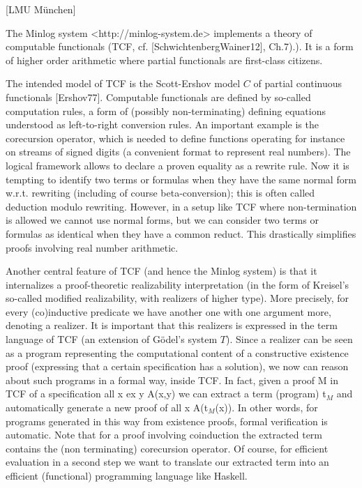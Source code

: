 [LMU München]

The Minlog system <http://minlog-system.de> implements a theory of
computable functionals (TCF, cf. [SchwichtenbergWainer12], Ch.7).).
It is a form of higher order arithmetic where partial functionals are
first-class citizens.

The intended model of TCF is the Scott-Ershov model $C$ of partial
continuous functionals [Ershov77].  Computable functionals are defined
by so-called computation rules, a form of (possibly non-terminating)
defining equations understood as left-to-right conversion rules.  An
important example is the corecursion operator, which is needed to
define functions operating for instance on streams of signed digits (a
convenient format to represent real numbers).  The logical framework
allows to declare a proven equality as a rewrite rule.  Now it is
tempting to identify two terms or formulas when they have the same
normal form w.r.t. rewriting (including of course beta-conversion);
this is often called deduction modulo rewriting.  However, in a setup
like TCF where non-termination is allowed we cannot use normal forms,
but we can consider two terms or formulas as identical when they have
a common reduct.  This drastically simplifies proofs involving real
number arithmetic.

Another central feature of TCF (and hence the Minlog system) is that
it internalizes a proof-theoretic realizability interpretation (in the
form of Kreisel's so-called modified realizability, with realizers of
higher type).  More precisely, for every (co)inductive predicate we
have another one with one argument more, denoting a realizer.  It is
important that this realizers is expressed in the term language of TCF
(an extension of G\"odel's system $T$).  Since a realizer can be seen as
a program representing the computational content of a constructive
existence proof (expressing that a certain specification has a
solution), we now can reason about such programs in a formal way,
inside TCF.  In fact, given a proof M in TCF of a specification all x
ex y A(x,y) we can extract a term (program) t$_M$ and automatically
generate a new proof of all x A(t$_M$(x)).  In other words, for
programs generated in this way from existence proofs, formal
verification is automatic.  Note that for a proof involving
coinduction the extracted term contains the (non terminating)
corecursion operator.  Of course, for efficient evaluation in a second
step we want to translate our extracted term into an efficient
(functional) programming language like Haskell.

